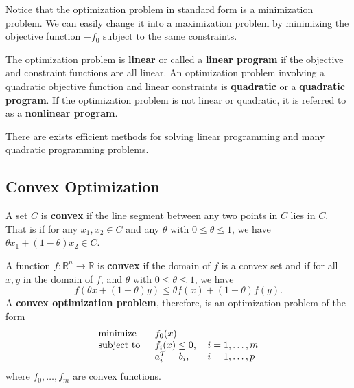 Notice that the optimization problem in standard form is a minimization problem.  We can easily change it into a maximization problem by minimizing the objective function $-f_0$ subject to the same constraints.

The optimization problem is {\color{tiananmen}\textbf{linear}} or called a {\color{tiananmen}\textbf{linear program}} if the objective and constraint functions are all linear. An optimization problem involving a quadratic objective function and linear constraints is {\color{tiananmen}\textbf{quadratic}} or a {\color{tiananmen}\textbf{quadratic program}}. If the optimization problem is not linear or quadratic, it is referred to as a {\color{tiananmen}\textbf{nonlinear program}}.

There are exists efficient methods for solving linear programming and many quadratic programming problems.

\subsection{Convex Optimization}

A set {\color{baystate}$C$} is {\color{tiananmen}\textbf{convex}} if the line segment between any two points in $C$ lies in $C$. That is {\color{baystate}if for any $x_1,x_2\in C$ and any $\theta$ with $0\leq\theta\leq 1$, we have $\theta x_1+(1-\theta)x_2\in C$}.

A function {\color{baystate}$f : \mathbb{R}^n\rightarrow\mathbb{R}$} is {\color{tiananmen}\textbf{convex}} if the domain of $f$ is a convex set and if for all $x,y$ in the domain of $f$, and $\theta$ with $0\leq\theta\leq 1$, we have
{\color{baystate}
	\begin{equation}
		f\left(\theta x+\left(1-\theta\right)y\right)\leq\theta f(x)+(1-\theta)f(y).
		\label{Convexity}
	\end{equation}
}
A {\color{tiananmen} \textbf{convex optimization problem}}, therefore, is an optimization problem of the form
{\color{baystate}
	\begin{equation}
		\begin{tabular}{lll}
			\text{minimize }   & $f_0(x)$          & \\
			\text{subject to } & $f_i(x)\leq 0$, & $i=1,\ldots, m$\\
			& $a_i^T = b_i$,      & $i=1,\ldots, p$
		\end{tabular}\label{ConvexOptimization}
	\end{equation}
	where $f_0,\ldots,f_m$ are convex functions.
}

